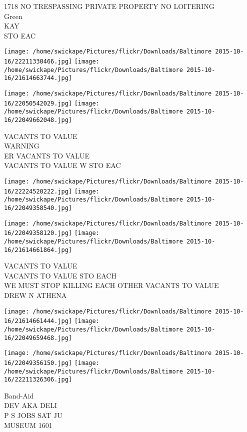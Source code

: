 \documentclass[10pt,letterpaper]{article}
\begin{document}
1718 NO TRESPASSING PRIVATE PROPERTY NO LOITERING\\
Green\\
KAY\\
STO EAC\\
\pagebreak

\texttt{[image: /home/swickape/Pictures/flickr/Downloads/Baltimore 2015-10-16/22211330466.jpg]}
\texttt{[image: /home/swickape/Pictures/flickr/Downloads/Baltimore 2015-10-16/21614663744.jpg]}

\texttt{[image: /home/swickape/Pictures/flickr/Downloads/Baltimore 2015-10-16/22050542029.jpg]}
\texttt{[image: /home/swickape/Pictures/flickr/Downloads/Baltimore 2015-10-16/22049662048.jpg]}

VACANTS TO VALUE\\
WARNING\\
ER VACANTS TO VALUE\\
VACANTS TO VALUE W STO EAC\\
\pagebreak

\texttt{[image: /home/swickape/Pictures/flickr/Downloads/Baltimore 2015-10-16/22224520222.jpg]}
\texttt{[image: /home/swickape/Pictures/flickr/Downloads/Baltimore 2015-10-16/22049358540.jpg]}

\texttt{[image: /home/swickape/Pictures/flickr/Downloads/Baltimore 2015-10-16/22049358120.jpg]}
\texttt{[image: /home/swickape/Pictures/flickr/Downloads/Baltimore 2015-10-16/21614661864.jpg]}

VACANTS TO VALUE\\
VACANTS TO VALUE STO EACH\\
WE MUST STOP KILLING EACH OTHER VACANTS TO VALUE\\
DREW N ATHENA\\
\pagebreak

\texttt{[image: /home/swickape/Pictures/flickr/Downloads/Baltimore 2015-10-16/21614661444.jpg]}
\texttt{[image: /home/swickape/Pictures/flickr/Downloads/Baltimore 2015-10-16/22049659468.jpg]}

\texttt{[image: /home/swickape/Pictures/flickr/Downloads/Baltimore 2015-10-16/22049356150.jpg]}
\texttt{[image: /home/swickape/Pictures/flickr/Downloads/Baltimore 2015-10-16/22211326306.jpg]}

Band{-}Aid\\
DEV AKA DELI\\
P S JOBS SAT JU\\
MUSEUM 1601\\
\pagebreak
\end{document}
